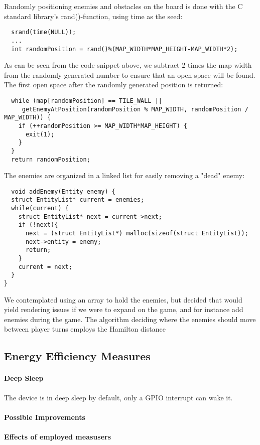 \documentclass{article}
\begin{document}
Randomly positioning enemies and obstacles on the board is done with the C standard library's rand()-function, using time as the seed:
\begin{lstlisting}
  srand(time(NULL));
  ...
  int randomPosition = rand()%(MAP_WIDTH*MAP_HEIGHT-MAP_WIDTH*2);
\end{lstlisting}
As can be seen from the code snippet above, we subtract 2 times the map width from the randomly generated number to ensure that an open space will be found. The first open space after the randomly generated position is returned:
\begin{lstlisting}
  while (map[randomPosition] == TILE_WALL ||
	 getEnemyAtPosition(randomPosition % MAP_WIDTH, randomPosition / MAP_WIDTH)) {
    if (++randomPosition >= MAP_WIDTH*MAP_HEIGHT) {
      exit(1);
    }
  }
  return randomPosition;
\end{lstlisting}

The enemies are organized in a linked list for easily removing a "dead" enemy:
\begin{lstlisting}
  void addEnemy(Entity enemy) {
  struct EntityList* current = enemies;
  while(current) {
    struct EntityList* next = current->next;
    if (!next){
      next = (struct EntityList*) malloc(sizeof(struct EntityList));
      next->entity = enemy;
      return;
    }
    current = next;
  }
}
\end{lstlisting}
We contemplated using an array to hold the enemies, but decided that would yield rendering issues if we were to expand on the game, and for instance add enemies during the game. The algorithm deciding where the enemies should move between player turns employs the Hamilton distance

\subsection*{Energy Efficiency Measures}
\paragraph{Deep Sleep}
The device is in deep sleep by default, only a GPIO interrupt can wake it.

\paragraph{Possible Improvements}

\paragraph{Effects of employed measusers}
\end{document}
